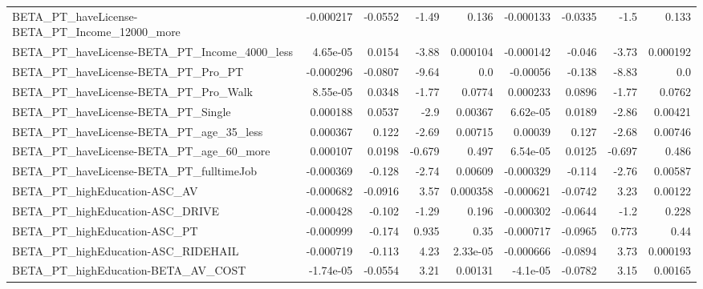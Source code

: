 \begin{tabular}{lrrrrrrrr}
BETA\_PT\_haveLicense-BETA\_PT\_Income\_12000\_more      &   -0.000217 &      -0.0552 &     -1.49 &    0.136 &  -0.000133 &     -0.0335 &         -1.5 &         0.133 \\
BETA\_PT\_haveLicense-BETA\_PT\_Income\_4000\_less       &    4.65e-05 &       0.0154 &     -3.88 & 0.000104 &  -0.000142 &      -0.046 &        -3.73 &      0.000192 \\
BETA\_PT\_haveLicense-BETA\_PT\_Pro\_PT                 &   -0.000296 &      -0.0807 &     -9.64 &      0.0 &   -0.00056 &      -0.138 &        -8.83 &           0.0 \\
BETA\_PT\_haveLicense-BETA\_PT\_Pro\_Walk               &    8.55e-05 &       0.0348 &     -1.77 &   0.0774 &   0.000233 &      0.0896 &        -1.77 &        0.0762 \\
BETA\_PT\_haveLicense-BETA\_PT\_Single                 &    0.000188 &       0.0537 &      -2.9 &  0.00367 &   6.62e-05 &      0.0189 &        -2.86 &       0.00421 \\
BETA\_PT\_haveLicense-BETA\_PT\_age\_35\_less            &    0.000367 &        0.122 &     -2.69 &  0.00715 &    0.00039 &       0.127 &        -2.68 &       0.00746 \\
BETA\_PT\_haveLicense-BETA\_PT\_age\_60\_more            &    0.000107 &       0.0198 &    -0.679 &    0.497 &   6.54e-05 &      0.0125 &       -0.697 &         0.486 \\
BETA\_PT\_haveLicense-BETA\_PT\_fulltimeJob            &   -0.000369 &       -0.128 &     -2.74 &  0.00609 &  -0.000329 &      -0.114 &        -2.76 &       0.00587 \\
BETA\_PT\_highEducation-ASC\_AV                       &   -0.000682 &      -0.0916 &      3.57 & 0.000358 &  -0.000621 &     -0.0742 &         3.23 &       0.00122 \\
BETA\_PT\_highEducation-ASC\_DRIVE                    &   -0.000428 &       -0.102 &     -1.29 &    0.196 &  -0.000302 &     -0.0644 &         -1.2 &         0.228 \\
BETA\_PT\_highEducation-ASC\_PT                       &   -0.000999 &       -0.174 &     0.935 &     0.35 &  -0.000717 &     -0.0965 &        0.773 &          0.44 \\
BETA\_PT\_highEducation-ASC\_RIDEHAIL                 &   -0.000719 &       -0.113 &      4.23 & 2.33e-05 &  -0.000666 &     -0.0894 &         3.73 &      0.000193 \\
BETA\_PT\_highEducation-BETA\_AV\_COST                 &   -1.74e-05 &      -0.0554 &      3.21 &  0.00131 &   -4.1e-05 &     -0.0782 &         3.15 &       0.00165 \\

\end{tabular}
